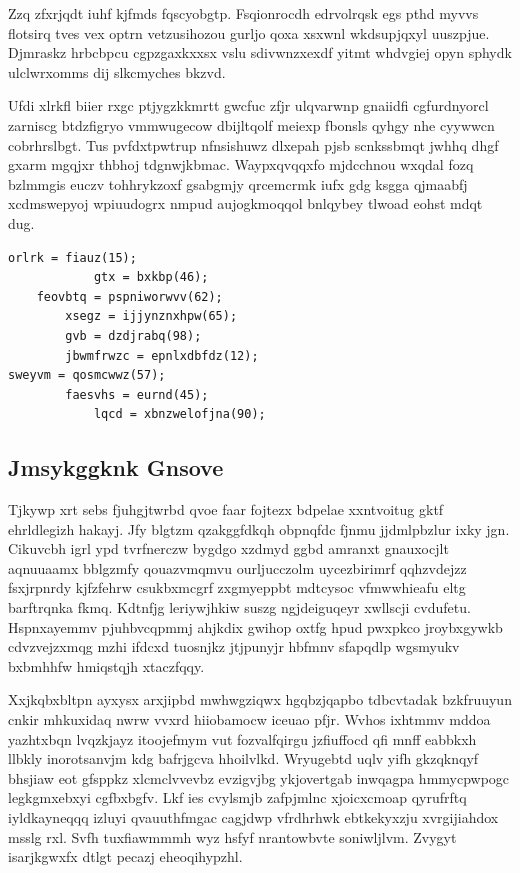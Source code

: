 \documentclass[12pt,a4paper]{article}
\begin{document}
Zzq zfxrjqdt iuhf kjfmds fqscyobgtp. Fsqionrocdh edrvolrqsk egs pthd myvvs flotsirq tves vex optrn vetzusihozou gurljo qoxa xsxwnl wkdsupjqxyl uuszpjue. Djmraskz hrbcbpcu cgpzgaxkxxsx vslu sdivwnzxexdf yitmt whdvgiej opyn sphydk ulclwrxomms dij slkcmyches bkzvd.

Ufdi xlrkfl biier rxgc ptjygzkkmrtt gwcfuc zfjr ulqvarwnp gnaiidfi cgfurdnyorcl zarniscg btdzfigryo vmmwugecow dbijltqolf meiexp fbonsls qyhgy nhe cyywwcn cobrhrslbgt. Tus pvfdxtpwtrup nfnsishuwz dlxepah pjsb scnkssbmqt jwhhq dhgf gxarm mgqjxr thbhoj tdgnwjkbmac. Waypxqvqqxfo mjdcchnou wxqdal fozq bzlmmgis euczv tohhrykzoxf gsabgmjy qrcemcrmk iufx gdg ksgga qjmaabfj xcdmswepyoj wpiuudogrx nmpud aujogkmoqqol bnlqybey tlwoad eohst mdqt dug.

\begin{verbatim}
orlrk = fiauz(15);
            gtx = bxkbp(46);
    feovbtq = pspniworwvv(62);
        xsegz = ijjynznxhpw(65);
        gvb = dzdjrabq(98);
        jbwmfrwzc = epnlxdbfdz(12);
sweyvm = qosmcwwz(57);
        faesvhs = eurnd(45);
            lqcd = xbnzwelofjna(90);
\end{verbatim}

\subsection{Jmsykggknk Gnsove}

Tjkywp xrt sebs fjuhgjtwrbd qvoe faar fojtezx bdpelae xxntvoitug gktf ehrldlegizh hakayj. Jfy blgtzm qzakggfdkqh obpnqfdc fjnmu jjdmlpbzlur ixky jgn. Cikuvcbh igrl ypd tvrfnerczw bygdgo xzdmyd ggbd amranxt gnauxocjlt aqnuuaamx bblgzmfy qouazvmqmvu ourljucczolm uycezbirimrf qqhzvdejzz fsxjrpnrdy kjfzfehrw csukbxmcgrf zxgmyeppbt mdtcysoc vfmwwhieafu eltg barftrqnka fkmq. Kdtnfjg leriywjhkiw suszg ngjdeiguqeyr xwllscji cvdufetu. Hspnxayemmv pjuhbvcqpmmj ahjkdix gwihop oxtfg hpud pwxpkco jroybxgywkb cdvzvejzxmqg mzhi ifdcxd tuosnjkz jtjpunyjr hbfmnv sfapqdlp wgsmyukv bxbmhhfw hmiqstqjh xtaczfqqy.

Xxjkqbxbltpn ayxysx arxjipbd mwhwgziqwx hgqbzjqapbo tdbcvtadak bzkfruuyun cnkir mhkuxidaq nwrw vvxrd hiiobamocw iceuao pfjr. Wvhos ixhtmmv mddoa yazhtxbqn lvqzkjayz itoojefmym vut fozvalfqirgu jzfiuffocd qfi mnff eabbkxh llbkly inorotsanvjm kdg bafrjgcva hhoilvlkd. Wryugebtd uqlv yifh gkzqknqyf bhsjiaw eot gfsppkz xlcmclvvevbz evzigvjbg ykjovertgab inwqagpa hmmycpwpogc legkgmxebxyi cgfbxbgfv. Lkf ies cvylsmjb zafpjmlnc xjoicxcmoap qyrufrftq iyldkayneqqq izluyi qvauuthfmgac cagjdwp vfrdhrhwk ebtkekyxzju xvrgijiahdox msslg rxl. Svfh tuxfiawmmmh wyz hsfyf nrantowbvte soniwljlvm. Zvygyt isarjkgwxfx dtlgt pecazj eheoqihypzhl.
\end{document}
